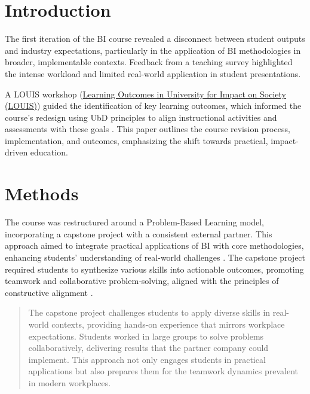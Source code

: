 \documentclass{article}
\begin{document}
\section{Introduction}
The first iteration of the BI course revealed a disconnect between student outputs and industry expectations, particularly in the application of BI methodologies in broader, implementable contexts. Feedback from a teaching survey highlighted the intense workload and limited real-world application in student presentations. 

A LOUIS workshop (\href{https://aurora-universities.eu/louis/}{Learning Outcomes in University for Impact on Society (LOUIS)}) guided the identification of key learning outcomes, which informed the course's redesign using UbD principles to align instructional activities and assessments with these goals \cite{wiggins2005understanding}. This paper outlines the course revision process, implementation, and outcomes, emphasizing the shift towards practical, impact-driven education.

\section{Methods}
The course was restructured around a Problem-Based Learning model, incorporating a capstone project with a consistent external partner. This approach aimed to integrate practical applications of BI with core methodologies, enhancing students' understanding of real-world challenges \cite{barrows1980problem}. The capstone project required students to synthesize various skills into actionable outcomes, promoting teamwork and collaborative problem-solving, aligned with the principles of constructive alignment \cite{biggs_constructive}.

\begin{quote}
The capstone project challenges students to apply diverse skills in real-world contexts, providing hands-on experience that mirrors workplace expectations. Students worked in large groups to solve problems collaboratively, delivering results that the partner company could implement. This approach not only engages students in practical applications but also prepares them for the teamwork dynamics prevalent in modern workplaces.
\end{quote}
\end{document}
